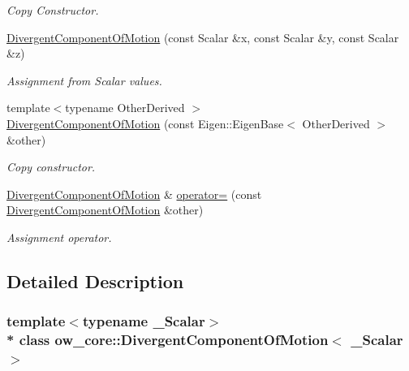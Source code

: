 \begin{DoxyCompactItemize}
\begin{DoxyCompactList}\small\item\em Copy Constructor. \end{DoxyCompactList}\item 
\hyperlink{classow__core_1_1DivergentComponentOfMotion_a715efccb555f56b1517e4895fda72f74}{Divergent\+Component\+Of\+Motion} (const Scalar \&x, const Scalar \&y, const Scalar \&z)\hypertarget{classow__core_1_1DivergentComponentOfMotion_a715efccb555f56b1517e4895fda72f74}{}\label{classow__core_1_1DivergentComponentOfMotion_a715efccb555f56b1517e4895fda72f74}

\begin{DoxyCompactList}\small\item\em Assignment from Scalar values. \end{DoxyCompactList}\item 
{\footnotesize template$<$typename Other\+Derived $>$ }\\\hyperlink{classow__core_1_1DivergentComponentOfMotion_acc16602f9d1e05ee953a8eccd6859b0a}{Divergent\+Component\+Of\+Motion} (const Eigen\+::\+Eigen\+Base$<$ Other\+Derived $>$ \&other)
\begin{DoxyCompactList}\small\item\em Copy constructor. \end{DoxyCompactList}\item 
\hyperlink{classow__core_1_1DivergentComponentOfMotion}{Divergent\+Component\+Of\+Motion} \& \hyperlink{classow__core_1_1DivergentComponentOfMotion_aa83fedab7f0bb467888ace1253a02c2d}{operator=} (const \hyperlink{classow__core_1_1DivergentComponentOfMotion}{Divergent\+Component\+Of\+Motion} \&other)\hypertarget{classow__core_1_1DivergentComponentOfMotion_aa83fedab7f0bb467888ace1253a02c2d}{}\label{classow__core_1_1DivergentComponentOfMotion_aa83fedab7f0bb467888ace1253a02c2d}

\begin{DoxyCompactList}\small\item\em Assignment operator. \end{DoxyCompactList}\end{DoxyCompactItemize}


\subsection{Detailed Description}
\subsubsection*{template$<$typename \+\_\+\+Scalar$>$\\*
class ow\+\_\+core\+::\+Divergent\+Component\+Of\+Motion$<$ \+\_\+\+Scalar $>$}

